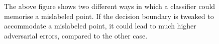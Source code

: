 \documentclass{ociamthesis}
\begin{document}
\begin{figure}[!h]
    \centering
    \qquad
    \caption{The above figure shows two different ways in which a classifier
    could memorise a mislabeled point. If the decision boundary is tweaked to
    accommodate a mislabeled point, it could lead to much higher adversarial
    errors, compared to the other case.}
    \label{fig:pockets-or-tweaks}

\end{figure}
\end{document}
